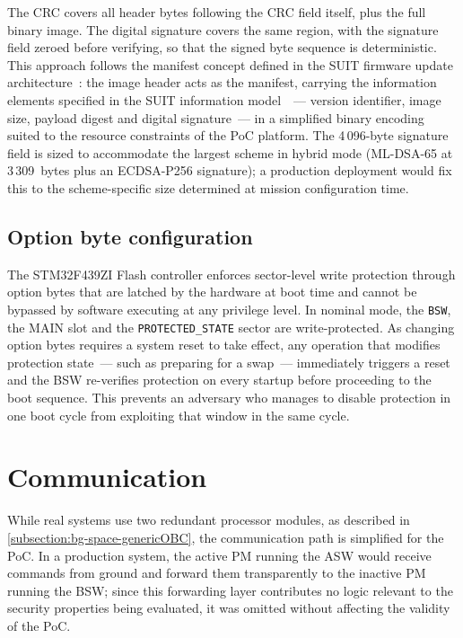 The CRC covers all header bytes following the CRC field itself, plus the full binary image. The digital signature covers the same region, with the signature field zeroed before verifying, so that the signed byte sequence is deterministic. This approach follows the manifest concept defined in the SUIT firmware update architecture~\cite{rfc9019}: the image header acts as the manifest, carrying the information elements specified in the SUIT information model~\cite{rfc9124}~--- version identifier, image size, payload digest and digital signature~--- in a simplified binary encoding suited to the resource constraints of the PoC platform. The 4\,096-byte signature field is sized to accommodate the largest scheme in hybrid mode (ML-DSA-65 at 3\,309~bytes plus an ECDSA-P256 signature); a production deployment would fix this to the scheme-specific size determined at mission configuration time.

\subsection{Option byte configuration}

The STM32F439ZI Flash controller enforces sector-level write protection through option bytes that are latched by the hardware at boot time and cannot be bypassed by software executing at any privilege level. In nominal mode, the \texttt{BSW}, the MAIN slot and the \texttt{PROTECTED\_STATE} sector are write-protected. As changing option bytes requires a system reset to take effect, any operation that modifies protection state~--- such as preparing for a swap~--- immediately triggers a reset and the BSW re-verifies protection on every startup before proceeding to the boot sequence. This prevents an adversary who manages to disable protection in one boot cycle from exploiting that window in the same cycle.

\section{Communication}
\label{section:implementation-comms}

While real systems use two redundant processor modules, as described in \autoref{subsection:bg-space-genericOBC}, the communication path is simplified for the PoC. In a production system, the active PM running the ASW would receive commands from ground and forward them transparently to the inactive PM running the BSW; since this forwarding layer contributes no logic relevant to the security properties being evaluated, it was omitted without affecting the validity of the PoC.

